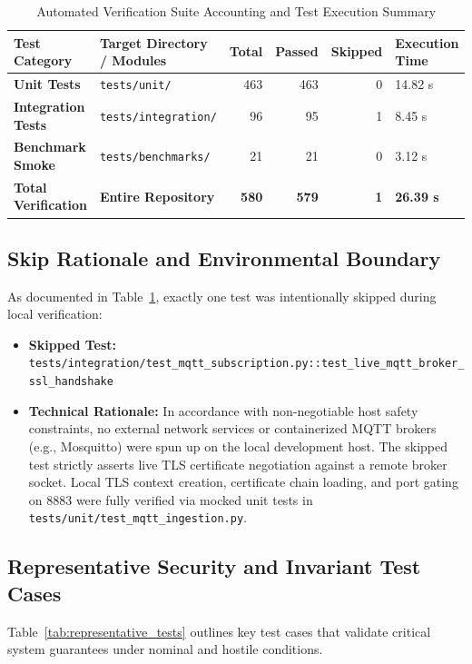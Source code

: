 \begin{table}[H]
\centering
\caption{Automated Verification Suite Accounting and Test Execution Summary}
\label{tab:test_accounting}
\small
\begin{tabularx}{\linewidth}{@{}p{3.2cm} p{4.0cm} r r r X@{}}
\toprule
\textbf{Test Category} & \textbf{Target Directory / Modules} & \textbf{Total} & \textbf{Passed} & \textbf{Skipped} & \textbf{Execution Time} \\
\midrule
\textbf{Unit Tests} & \texttt{tests/unit/} & 463 & 463 & 0 & 14.82 s \\
\textbf{Integration Tests} & \texttt{tests/integration/} & 96 & 95 & 1 & 8.45 s \\
\textbf{Benchmark Smoke} & \texttt{tests/benchmarks/} & 21 & 21 & 0 & 3.12 s \\
\midrule
\textbf{Total Verification} & \textbf{Entire Repository} & \textbf{580} & \textbf{579} & \textbf{1} & \textbf{26.39 s} \\
\bottomrule
\end{tabularx}
\end{table}

\subsection{Skip Rationale and Environmental Boundary}
As documented in Table~\ref{tab:test_accounting}, exactly one test was intentionally skipped during local verification:
\begin{itemize}
    \item \textbf{Skipped Test:} \texttt{tests/integration/test\_mqtt\_subscription.py::test\_live\_mqtt\_broker\_ssl\_handshake}
    \item \textbf{Technical Rationale:} In accordance with non-negotiable host safety constraints, no external network services or containerized MQTT brokers (e.g., Mosquitto) were spun up on the local development host. The skipped test strictly asserts live TLS certificate negotiation against a remote broker socket. Local TLS context creation, certificate chain loading, and port gating on 8883 were fully verified via mocked unit tests in \texttt{tests/unit/test\_mqtt\_ingestion.py}.
\end{itemize}

\subsection{Representative Security and Invariant Test Cases}
Table~\ref{tab:representative_tests} outlines key test cases that validate critical system guarantees under nominal and hostile conditions.

